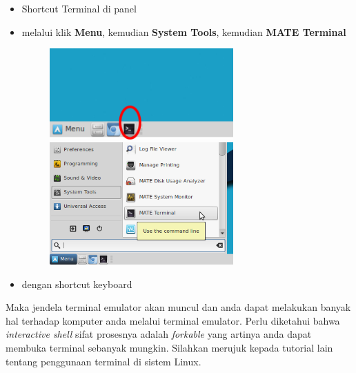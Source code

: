 \documentclass[12pt,]{article}
\begin{document}
	\begin{itemize}
		\item Shortcut Terminal di panel
		\item melalui klik \textbf{Menu}, kemudian \textbf{System Tools}, kemudian \textbf{MATE Terminal} 
		
		\begin{figure}[!ht]
			\centering
			\includegraphics[width=200pt]{png/panelterminal}
			\includegraphics[width=200pt]{png/termmenu}
		\end{figure}
	
		\item dengan shortcut keyboard 
	\end{itemize}

	Maka jendela terminal emulator akan muncul dan anda dapat melakukan banyak hal terhadap komputer anda melalui terminal emulator.
	Perlu diketahui bahwa \textit{interactive shell} sifat prosesnya adalah \textit{forkable} yang artinya anda dapat membuka terminal sebanyak mungkin.
	Silahkan merujuk kepada tutorial lain tentang penggunaan terminal di sistem Linux.
	
\end{document}
